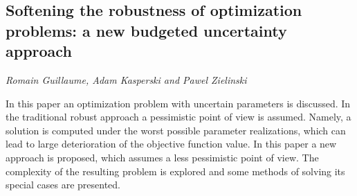\documentclass[../booklet.tex]{subfiles}
\begin{document}
\subsection[Softening the robustness of optimization problems: a new budgeted uncertainty approach. {\it Romain Guillaume, Adam Kasperski and Pawel Zielinski}]{Softening the robustness of optimization problems: a new budgeted uncertainty approach}
  

\begin{center}
  {\it Romain Guillaume, Adam Kasperski and Pawel Zielinski}
\end{center}

\vskip 0.8cm


In this paper an optimization problem with uncertain parameters is discussed. In the traditional robust approach a pessimistic point of view is assumed. Namely, a solution is computed under the worst possible parameter realizations, which can lead to large deterioration of the objective  function value. In this paper a new approach is proposed, which assumes a less pessimistic point of view.  The complexity of the resulting problem is explored and some methods of solving its special cases are presented.
\end{document}
